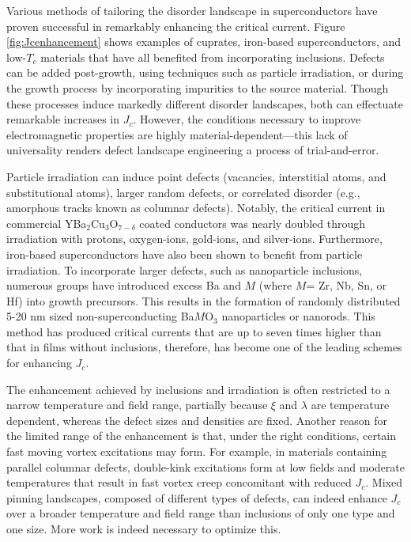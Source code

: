 \documentclass[%
 aip,
 amsmath,amssymb,
 reprint,%
floatfix]{revtex4-1}
\newcommand{\Jc}{J_{c}}
\begin{document}
Various methods of tailoring the disorder landscape in superconductors have proven successful in remarkably enhancing the critical current. Figure \ref{fig:Jcenhancement} shows examples of cuprates, iron-based superconductors, and low-$T_c$ materials that have all benefited from incorporating inclusions.  Defects can be added post-growth, using techniques such as particle irradiation,\cite{Leroux2015, Eley2017a, Tamegai2012, Averback1997, Fang2011, Gapud2015, Goeckner2003, Haberkorn2015a, Haberkorn2015b, Haberkorn2012a, Iwasa1988, Jia2013, Kihlstrom2013, Kirk1999, Konczykowski1991, Matsui2012, Nakajima2009, Roas1989, Salovich2013, Sun2015, SwiecickiPhysRevB12, Taen2012, Taen2015, Thompson1991, Vlcek1993, Zhu1993, Leonard2013} or during the growth process by incorporating impurities to the source material.\cite{Miura2013k, Haugan2004, Horide2013, Miura2011, PalauSUST2010, WimbushSUST10} Though these processes induce markedly different disorder landscapes, both can effectuate remarkable increases in $\Jc$.  However, the conditions necessary to improve electromagnetic properties are highly material-dependent---this lack of universality renders defect landscape engineering a process of trial-and-error. 

Particle irradiation can induce point defects (vacancies, interstitial atoms, and substitutional atoms), larger random defects, or correlated disorder (e.g., amorphous tracks known as columnar defects). Notably, the critical current in commercial YBa$_2$Cu$_3$O$_{7-\delta}$ coated conductors was nearly doubled through irradiation with protons\cite{Jia2013}, oxygen-ions\cite{Leroux2015, Eley2017}, gold-ions\cite{Rupich2016}, and silver-ions.  Furthermore, iron-based superconductors have also been shown to benefit from particle irradiation\cite{Tamegai2012}.  To incorporate larger defects, such as nanoparticle inclusions, numerous groups\cite{MacManus-Driscoll2004, Feighan2017, Miura2013k, Miura2011, Miura2016, Miura2017} have introduced excess Ba and $M$ (where $M$= Zr, Nb, Sn, or Hf) into growth precursors. This results in the formation of randomly distributed 5-20 nm sized non-superconducting Ba$M$O$_3$ nanoparticles or nanorods.  This method has produced critical currents that are up to seven times higher than that in films without inclusions,\cite{Miura2013} therefore, has become one of the leading schemes for enhancing $\Jc$.



The enhancement achieved by inclusions and irradiation is often restricted to a narrow temperature and field range, partially because $\xi$ and $\lambda$ are temperature dependent, whereas the defect sizes and densities are fixed.  Another reason for the limited range of the enhancement is that, under the right conditions, certain fast moving vortex excitations may form. For example, in materials containing parallel columnar defects, double-kink excitations form at low fields and moderate temperatures that result in fast vortex creep concomitant with reduced  $\Jc$. \cite{Maiorov2009} Mixed pinning landscapes, composed of different types of defects, can indeed enhance $\Jc$ over a broader temperature and field range than inclusions of only one type and one size.  More work is indeed necessary to optimize this. 
\end{document}
